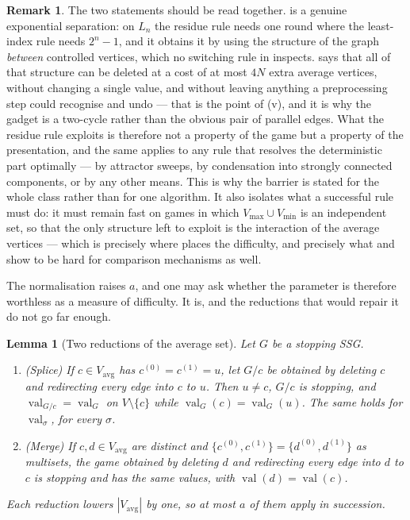 \documentclass[11pt]{article}
\theoremstyle{plain}
\newtheorem{lemma}[theorem]{Lemma}
\theoremstyle{definition}
\newtheorem{remark}[theorem]{Remark}
\DeclareMathOperator{\val}{val}
\newcommand{\Vmax}{V_{\max}}
\newcommand{\Vmin}{V_{\min}}
\newcommand{\Vavg}{V_{\mathrm{avg}}}
\begin{document}
\begin{remark}\label{rem:normalform}
The two statements should be read together.
 is a genuine exponential separation: on
$L_n$ the residue rule needs one round where the least-index rule needs
$2^{n}-1$, and it obtains it by using the structure of the graph
\emph{between} controlled vertices, which no switching rule in
 inspects.  says that all of
that structure can be deleted at a cost of at most $4N$ extra average
vertices, without changing a single value, and without leaving anything a
preprocessing step could recognise and undo --- that is the point of
(v), and it is why the gadget is a two-cycle rather
than the obvious pair of parallel edges. What the residue rule exploits
is therefore not a property of the game but a property of the
presentation, and the same applies to any rule that resolves the
deterministic part optimally --- by attractor sweeps, by condensation into
strongly connected components, or by any other means. This is why the
barrier is stated for the whole class  rather
than for one algorithm. It also isolates what a successful rule must do:
it must remain fast on games in which $\Vmax\cup\Vmin$ is an independent
set, so that the only structure left to exploit is the interaction of the
average vertices --- which is precisely where 
places the difficulty, and precisely what  and
 show to be hard for comparison mechanisms as
well.
\end{remark}

The normalisation raises $a$, and one may ask whether the parameter is
therefore worthless as a measure of difficulty. It is, and the reductions
that would repair it do not go far enough.

\begin{lemma}[Two reductions of the average set]\label{lem:splice}
Let $G$ be a stopping SSG.
\begin{enumerate}[label=(\alph*),leftmargin=2.2em]
\item \textup{(Splice)} If $c\in\Vavg$ has $c^{(0)}=c^{(1)}=u$, let $G/c$
      be obtained by deleting $c$ and redirecting every edge into $c$ to
      $u$. Then $u\ne c$, $G/c$ is stopping, and
      $\val_{G/c}=\val_G$ on $V\setminus\{c\}$ while
      $\val_G(c)=\val_G(u)$. The same holds for $\val_\sigma$, for every
      $\sigma$.
\item \textup{(Merge)} If $c,d\in\Vavg$ are distinct and
      $\{c^{(0)},c^{(1)}\}=\{d^{(0)},d^{(1)}\}$ as multisets, the game
      obtained by deleting $d$ and redirecting every edge into $d$ to $c$
      is stopping and has the same values, with $\val(d)=\val(c)$.
\end{enumerate}
Each reduction lowers $|\Vavg|$ by one, so at most $a$ of them apply in
succession.
\end{lemma}
\end{document}
